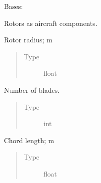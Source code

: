 \documentclass[letterpaper,10pt,english]{sphinxmanual}
\begin{document}
\begin{fulllineitems}
\label{\detokenize{modules/rotor:rotor.Rotor}}
\sphinxAtStartPar
Bases: 

\sphinxAtStartPar
Rotors as aircraft components.

\begin{fulllineitems}
\label{\detokenize{modules/rotor:rotor.Rotor.radius}}
\sphinxAtStartPar
Rotor radius; m
\begin{quote}\begin{description}
\item[{Type}] \leavevmode
\sphinxAtStartPar
float

\end{description}\end{quote}

\end{fulllineitems}


\begin{fulllineitems}
\label{\detokenize{modules/rotor:rotor.Rotor.number_of_blades}}
\sphinxAtStartPar
Number of blades.
\begin{quote}\begin{description}
\item[{Type}] \leavevmode
\sphinxAtStartPar
int

\end{description}\end{quote}

\end{fulllineitems}


\begin{fulllineitems}
\label{\detokenize{modules/rotor:rotor.Rotor.chord}}
\sphinxAtStartPar
Chord length; m
\begin{quote}\begin{description}
\item[{Type}] \leavevmode
\sphinxAtStartPar
float


\end{description}
\end{quote}
\end{fulllineitems}
\end{fulllineitems}
\end{document}
